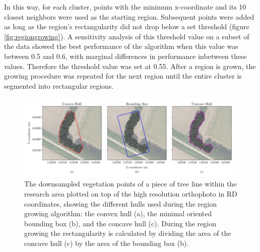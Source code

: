 In this way, for each cluster, points with the minimum x-coordinate and its 10 closest neighbors were used as the starting region. Subsequent points were added as long as the region’s rectangularity did not drop below a set threshold (figure \ref{fig:regiongrowing}). A sensitivity analysis of this threshold value on a subset of the data showed the best performance of the algorithm when this value was between 0.5 and 0.6, with marginal differences in performance inbetween these values. Therefore the threshold value was set at 0.55. After a region is grown, the growing procedure was repeated for the next region until the entire cluster is segmented into rectangular regions.


\begin{figure}
	\centering
	\includegraphics[width=\columnwidth]{./img/hulls.pdf}
	\caption{The downsampled vegetation points of a piece of tree line within the research area  plotted on top of the high resolution orthophoto in RD coordinates, showing the different hulls used during the region growing algorithm: the convex hull (a), the minimal oriented bounding box (b), and the concave hull (c). During the region growing the rectangularity is calculated by dividing the area of the concave hull (c) by the area of the bounding box (b).}
	\label{fig:hulls}
\end{figure}

